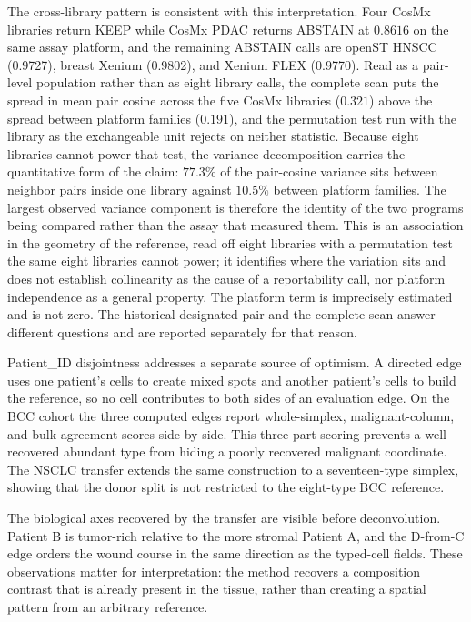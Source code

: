 The cross-library pattern is consistent with this interpretation. Four CosMx libraries return KEEP while CosMx PDAC returns ABSTAIN at \(0.8616\) on the same assay platform, and the remaining ABSTAIN calls are openST HNSCC (0.9727), breast Xenium (0.9802), and Xenium FLEX (0.9770). Read as a pair-level population rather than as eight library calls, the complete scan puts the spread in mean pair cosine across the five CosMx libraries (\(0.321\)) above the spread between platform families (\(0.191\)), and the permutation test run with the library as the exchangeable unit rejects on neither statistic. Because eight libraries cannot power that test, the variance decomposition carries the quantitative form of the claim: \(77.3\%\) of the pair-cosine variance sits between neighbor pairs inside one library against \(10.5\%\) between platform families. The largest observed variance component is therefore the identity of the two programs being compared rather than the assay that measured them. This is an association in the geometry of the reference, read off eight libraries with a permutation test the same eight libraries cannot power; it identifies where the variation sits and does not establish collinearity as the cause of a reportability call, nor platform independence as a general property. The platform term is imprecisely estimated and is not zero. The historical designated pair and the complete scan answer different questions and are reported separately for that reason.

Patient\_ID disjointness addresses a separate source of optimism. A directed edge uses one patient's cells to create mixed spots and another patient's cells to build the reference, so no cell contributes to both sides of an evaluation edge. On the BCC cohort the three computed edges report whole-simplex, malignant-column, and bulk-agreement scores side by side. This three-part scoring prevents a well-recovered abundant type from hiding a poorly recovered malignant coordinate. The NSCLC transfer extends the same construction to a seventeen-type simplex, showing that the donor split is not restricted to the eight-type BCC reference.

The biological axes recovered by the transfer are visible before deconvolution. Patient B is tumor-rich relative to the more stromal Patient A, and the D-from-C edge orders the wound course in the same direction as the typed-cell fields. These observations matter for interpretation: the method recovers a composition contrast that is already present in the tissue, rather than creating a spatial pattern from an arbitrary reference.

